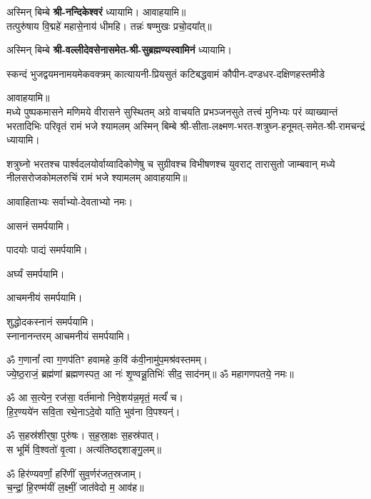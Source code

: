 \begin{center}
अस्मिन् बिम्बे \textbf{श्री-नन्दिकेश्वरं} ध्यायामि। आवाहयामि॥\\

तत्पुरु॑षाय वि॒द्महे॑ महासे॒नाय॑ धीमहि। तन्नः॑ षण्मुखः प्रचो॒दया᳚त्॥

अस्मिन् बिम्बे \textbf{श्री-वल्लीदेवसेनासमेत-श्री-सुब्रह्मण्यस्वामिनं} ध्यायामि।

{स्कन्दं भुजद्वयमनामयमेकवक्त्रम्}
{कात्यायनी-प्रियसुतं कटिबद्धवामं}
{कौपीन-दण्डधर-दक्षिणहस्तमीडे}

आवाहयामि॥\\

{मध्ये पुष्पकमासने मणिमये वीरासने सुस्थितम्}
{अग्रे वाचयति प्रभञ्जनसुते तत्त्वं मुनिभ्यः परं}
{व्याख्यान्तं भरतादिभिः परिवृतं रामं भजे श्यामलम्}
अस्मिन् बिम्बे श्री-सीता-लक्ष्मण-भरत-शत्रुघ्न-हनूमत्-समेत-श्री-रामचन्द्रं ध्यायामि।

{शत्रुघ्नो भरतश्च पार्श्वदलयोर्वाय्वादिकोणेषु च}
{सुग्रीवश्च विभीषणश्च युवराट् तारासुतो जाम्बवान्}
{मध्ये नीलसरोजकोमलरुचिं रामं भजे श्यामलम्}
आवाहयामि॥\\\medskip

आवाहिताभ्यः सर्वाभ्यो-देवताभ्यो नमः।

आसनं समर्पयामि।

पादयोः पाद्यं समर्पयामि।

अर्घ्यं समर्पयामि।

आचमनीयं समर्पयामि।

शुद्धोदकस्नानं समर्पयामि।\\
स्नानानन्तरम् आचमनीयं समर्पयामि।


ॐ ग॒णानां᳚ त्वा ग॒णप॑तिꣳ हवामहे क॒विं क॑वी॒नामु॑प॒मश्र॑\-वस्तमम्।\\
ज्ये॒ष्ठ॒राजं॒ ब्रह्म॑णां ब्रह्मणस्पत॒ आ नः॑ शृ॒ण्वन्नू॒तिभिः॑ सीद॒ साद॑नम्॥
ॐ महागणपतये॒ नमः॥

ॐ आ स॒त्येन॒ रज॑सा॒ वर्त॑मानो निवे॒शय॑न्न॒मृतं॒ मर्त्यं॑ च।\\
हि॒र॒ण्यये॑न सवि॒ता रथे॒नाऽदे॒वो या॑ति॒ भुव॑ना वि॒पश्यन्॑।

ॐ स॒हस्र॑शीर्‌षा॒ पुरु॑षः। स॒ह॒स्रा॒क्षः स॒हस्र॑पात्।\\
स भूमिं॑ वि॒श्वतो॑ वृ॒त्वा। अत्य॑तिष्ठद्दशाङ्गु॒लम्॥

ॐ हिर॑ण्यवर्णां॒ हरि॑णीं सुव॒र्णर॑जत॒स्रजाम्।\\
च॒न्द्रां॒ हि॒रण्म॑यीं ल॒क्ष्मीं॒ जात॑वेदो म॒ आव॑ह॥


\end{center}
